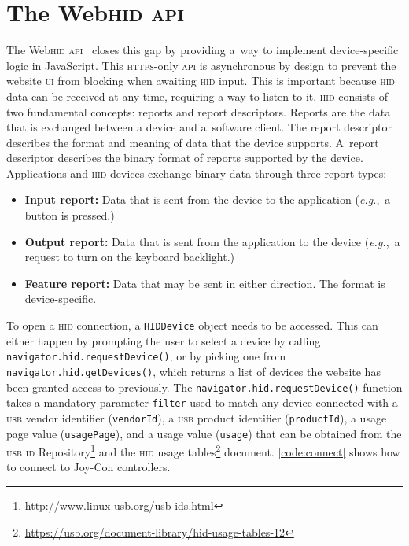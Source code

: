 \documentclass[sigconf]{acmart}
\begin{document}
\section{The Web\textsc{hid} \textsc{api}}

The Web\textsc{hid} \textsc{api}~\cite{webhid21} closes this gap by providing a~way
to implement device-specific logic in JavaScript.
This \textsc{https}-only \textsc{api} is asynchronous by design to prevent the website \textsc{ui}
from blocking when awaiting \textsc{hid} input.
This is important because \textsc{hid} data can be received at any time,
requiring a way to listen to it.
\textsc{hid} consists of two fundamental concepts: reports and report descriptors.
Reports are the data that is exchanged between a device and a~software client.
The report descriptor describes the format and meaning of data that the device supports.
A~report descriptor describes the binary format of reports supported by the device.
Applications and \textsc{hid} devices exchange binary data through three report types:

\begin{itemize}
  \item \textbf{Input report:}	Data that is sent from the device
    to the application (\textit{e.g.},\ a button is pressed.)
  \item \textbf{Output report:}	Data that is sent from the application
    to the device (\textit{e.g.},\ a request to turn on the keyboard backlight.)
  \item \textbf{Feature report:} Data that may be sent in either direction.
    The format is device-specific.
\end{itemize}

To open a \textsc{hid} connection, a \texttt{HIDDevice} object needs to be accessed.
This can either happen by prompting the user to select a device by calling
\texttt{navigator.hid.requestDevice()},
or by picking one from \texttt{navigator.hid.getDevices()},
which returns a list of devices the website has been granted access to previously.
The \texttt{navigator.hid.requestDevice()} function takes a mandatory parameter \texttt{filter}
used to match any device connected with a \textsc{usb} vendor identifier (\texttt{vendorId}),
a \textsc{usb} product identifier (\texttt{productId}),
a usage page value (\texttt{usagePage}), and a usage value (\texttt{usage})
that can be obtained from the \textsc{usb} \textsc{id}
Repository\footnote{\url{http://www.linux-usb.org/usb-ids.html}}
and the \textsc{hid} usage
tables\footnote{\url{https://usb.org/document-library/hid-usage-tables-12}} document.
\autoref{code:connect} shows how to connect to Joy-Con controllers.
\end{document}
